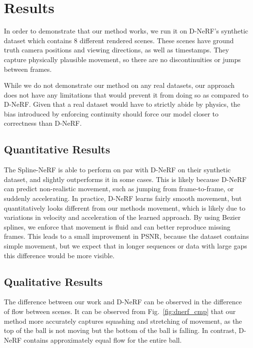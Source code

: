 \section*{Results}

In order to demonstrate that our method works, we run it on D-NeRF's synthetic
dataset which contains 8 different rendered scenes. These scenes have ground truth camera positions and viewing directions, as well as timestamps. They capture physically plausible movement, so there are no discontinuities or jumps between frames.

While we do not demonstrate our method on any real datasets, our approach does not have any limitations that would prevent it from doing so as compared to D-NeRF. Given that a real dataset would have to strictly abide by physics, the bias introduced by enforcing continuity should force our model closer to correctness than D-NeRF.

\subsection*{Quantitative Results}

The Spline-NeRF is able to perform on par with D-NeRF on their synthetic dataset, and slightly outperforms it in some cases. This is likely because D-NeRF can predict non-realistic movement, such as jumping from frame-to-frame, or suddenly accelerating. In practice, D-NeRF learns fairly smooth movement, but quantitatively looks different from our methods movement, which is likely due to variations in velocity and acceleration of the learned approach. By using Bezier splines, we enforce that movement is fluid and can better reproduce missing frames. This leads to a small improvement in PSNR, because the dataset contains simple movement, but we expect that in longer sequences or data with large gaps this difference would be more visible.

\subsection*{Qualitative Results}

The difference between our work and D-NeRF can be observed in the difference of flow between scenes. It can be observed from Fig.~\ref{fig:dnerf_cmp} that our method more accurately captures squashing and stretching of movement, as the top of the ball is not moving but the bottom of the ball is falling. In contrast, D-NeRF contains approximately equal flow for the entire ball.

